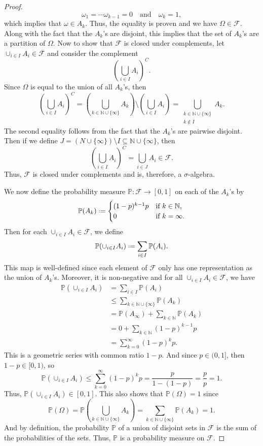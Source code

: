 \documentclass[12pt]{article}
\newcommand{\isp}[1]{\quad\text{#1}\quad}
\newcommand*{\defeq}{\mathrel{\vcenter{\baselineskip0.5ex \lineskiplimit0pt\hbox{\scriptsize.}\hbox{\scriptsize.}}}=}
\newcommand{\N}{\mathbb{N}} %
\renewcommand{\P}{\mathbb{P}} %
\newcommand{\FF}{\mathcal{F}} %
\newcommand{\<}{\left\langle} %
\renewcommand{\>}{\right\rangle} %
\begin{document}
\begin{proof}
    \[\omega_1 = \cdots \omega_{k-1} = 0 \isp{and} \omega_k = 1,\]
    which implies that $\omega \in A_k$. Thus, the equality is proven and we have $\Omega \in \FF$. Along with the fact that the $A_k$'s are disjoint, this implies that the set of $A_k$'s are a partition of $\Omega$. Now to show that $\FF$ is closed under complements, let $\cup_{i \in I} A_i \in \FF$ and consider the complement
    \[\left( \bigcup_{i \in I} A_i \right)^C.\]
    Since $\Omega$ is equal to the union of all $A_k$'s, then
    \[\left( \bigcup_{i \in I} A_i \right)^C = \left( \bigcup_{k \in \N\cup\{\infty\}} A_k \right) \setminus \left( \bigcup_{i \in I} A_i \right) = \bigcup_{\substack{k \in \N\cup\{\infty\} \\ k \notin I}} A_k.\]
    The second equality follows from the fact that the $A_k$'s are pairwise disjoint. Then if we define $J = (N \cup \{\infty\}) \setminus I \subseteq \N \cup \{\infty\}$, then
    \[\left( \bigcup_{i \in I} A_i \right)^C = \bigcup_{i \in J} A_i \in \FF.\]
    Thus, $\FF$ is closed under complements and is, therefore, a $\sigma$-algebra.
    
    We now define the probability measure $\P : \FF \to [0, 1]$ on each of the $A_k$'s by
    \[\P(A_k) \defeq 
        \begin{cases}
            (1-p)^{k-1}p &\text{if $k \in \N$,} \\
            0 &\text{if $k = \infty$.}
        \end{cases}
    \]
    Then for each $\cup_{i \in I} A_i \in \FF$, we define
    \[\P(\cup_{i \in I} A_i) \defeq \sum_{i \in I} \P(A_i).\]
    This map is well-defined since each element of $\FF$ only has one representation as the union of $A_k$'s. Moreover, it is non-negative and for all $\cup_{i \in I} A_i \in \FF$, we have
    \begin{align*}
        \P(\cup_{i \in I} A_i) 
            &= \sum_{i \in I} \P(A_i) \\
            &\leq \sum_{k \in \N \cup \{\infty\}} \P(A_k) \\
            &= \P(A_\infty) + \sum_{k \in \N} \P(A_k) \\
            &= 0 + \sum_{k \in \N} (1-p)^{k-1}p \\
            &= \sum_{k = 0}^\infty(1-p)^kp.
    \end{align*}
    This is a geometric series with common ratio $1-p$. And since $p \in (0, 1]$, then $1-p \in [0, 1)$, so 
    \[\P(\cup_{i \in I} A_i) \leq \sum_{k = 0}^\infty(1-p)^kp = \frac{p}{1 - (1-p)} = \frac{p}{p} = 1.\]
    Thus, $\P(\cup_{i \in I} A_i) \in [0, 1]$. This also shows that $\P(\Omega) = 1$ since
    \[\P(\Omega) = \P\left(  \bigcup_{k\in \N \cup\{\infty\}} A_k \right) = \sum_{k \in \N \cup \{\infty\}} \P(A_k) = 1.\]
    And by definition, the probability $\P$ of a union of disjoint sets in $\FF$ is the sum of the probabilities of the sets. Thus, $\P$ is a probability measure on $\FF$.
    

\end{proof}
\end{document}

